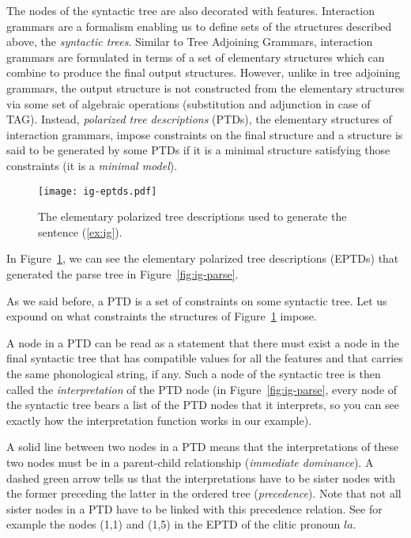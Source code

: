The nodes of the syntactic tree are also decorated with
features. Interaction grammars are a formalism enabling us to define
sets of the structures described above, the \emph{syntactic
  trees}. Similar to Tree Adjoining Grammars, interaction grammars are
formulated in terms of a set of elementary structures which can combine
to produce the final output structures. However, unlike in tree
adjoining grammars, the output structure is not constructed from the
elementary structures via some set of algebraic operations (substitution
and adjunction in case of TAG). Instead, \emph{polarized tree
  descriptions} (PTDs), the elementary structures of interaction
grammars, impose constraints on the final structure and a structure is
said to be generated by some PTDs if it is a minimal structure
satisfying those constraints (it is a \emph{minimal model}).

\begin{figure}
  \centering
  \texttt{[image: ig-eptds.pdf]}
  \caption{\label{fig:ig-eptds} The elementary polarized tree
    descriptions used to generate the sentence (\ref{ex:ig}).}
\end{figure}

In Figure~\ref{fig:ig-eptds}, we can see the elementary polarized tree
descriptions (EPTDs) that generated the parse tree in
Figure~\ref{fig:ig-parse}.

As we said before, a PTD is a set of constraints on some syntactic
tree. Let us expound on what constraints the structures of
Figure~\ref{fig:ig-eptds} impose.

A node in a PTD can be read as a statement that there must exist a node
in the final syntactic tree that has compatible values for all the
features and that carries the same phonological string, if any. Such a
node of the syntactic tree is then called the \emph{interpretation} of
the PTD node (in Figure~\ref{fig:ig-parse}, every node of the syntactic
tree bears a list of the PTD nodes that it interprets, so you can see
exactly how the interpretation function works in our example).

A solid line between two nodes in a PTD means that the interpretations
of these two nodes must be in a parent-child relationship
(\emph{immediate dominance}). A dashed green arrow tells us that the
interpretations have to be sister nodes with the former preceding the
latter in the ordered tree (\emph{precedence}). Note that not all sister
nodes in a PTD have to be linked with this precedence relation. See for
example the nodes (1,1) and (1,5) in the EPTD of the clitic pronoun
$la$.

